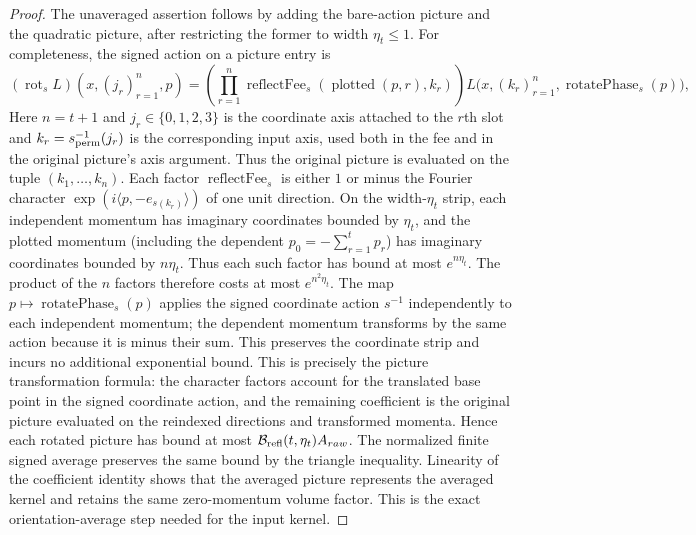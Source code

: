 \begin{proof}
The unaveraged assertion follows by adding the bare-action picture and the
quadratic picture, after restricting the former to width $\eta_t\leq1$.
For completeness, the signed action on a picture entry is
\[
 (\operatorname{rot}_s L)(x,(j_r)_{r=1}^n,p)=
 \left(\prod_{r=1}^{n}\operatorname{reflectFee}_s
       (\operatorname{plotted}(p,r),k_r)\right)
 L\bigl(x,(k_r)_{r=1}^n,\operatorname{rotatePhase}_s(p)\bigr),
 \]
Here $n=t+1$ and $j_r\in\{0,1,2,3\}$ is the coordinate axis attached to the
$r$th slot and $k_r=s_{\rm perm}^{-1}(j_r)$ is the corresponding input axis,
used both in the fee and in the original picture's axis argument. Thus the
original picture is evaluated on the tuple $(k_1,\ldots,k_n)$. Each factor $\operatorname{reflectFee}_s$ is either $1$ or minus
the Fourier character $\exp(i\langle p,-e_{s(k_r)}\rangle)$ of one unit
direction. On the width-$\eta_t$ strip, each independent momentum has
imaginary coordinates bounded by $\eta_t$, and the plotted momentum
(including the dependent $p_0=-\sum_{r=1}^t p_r$) has imaginary coordinates
bounded by $n\eta_t$. Thus each such factor has bound at most
$e^{n\eta_t}$. The product of the $n$ factors therefore costs at most
$e^{n^2\eta_t}$. The map $p\mapsto\operatorname{rotatePhase}_s(p)$ applies
the signed coordinate action $s^{-1}$ independently to each independent
momentum; the dependent momentum transforms by the same action because it is
minus their sum. This preserves the coordinate strip and incurs no additional
exponential bound. This is precisely the picture transformation formula:
the character factors account for the translated base point in the signed
coordinate action, and the remaining coefficient is the original picture
evaluated on the reindexed directions and transformed momenta. Hence each
rotated picture has bound at most
$\mathcal B_{\rm refl}(t,\eta_t)A_{raw}$. The normalized finite signed
average preserves the same bound by the triangle inequality. Linearity of
the coefficient identity shows that the averaged picture represents the
averaged kernel and retains the same zero-momentum volume factor. This is the exact
orientation-average step needed for the input kernel.
\end{proof}
